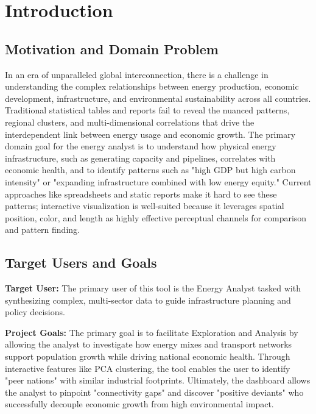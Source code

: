 \documentclass[conference]{IEEEtran}
\begin{document}
\section{Introduction}
\subsection{Motivation and Domain Problem}
In an era of unparalleled global interconnection, there is a challenge in understanding the complex relationships between energy production, economic development, infrastructure, and environmental sustainability across all countries. Traditional statistical tables and reports fail to reveal the nuanced patterns, regional clusters, and multi-dimensional correlations that drive the interdependent link between energy usage and economic growth. The primary domain goal for the energy analyst is to understand how physical energy infrastructure, such as generating capacity and pipelines, correlates with economic health, and to identify patterns such as "high GDP but high carbon intensity" or "expanding infrastructure combined with low energy equity." Current approaches like spreadsheets and static reports make it hard to see these patterns; interactive visualization is well-suited because it leverages spatial position, color, and length as highly effective perceptual channels for comparison and pattern finding.

\subsection{Target Users and Goals}
\textbf{Target User:} The primary user of this tool is the Energy Analyst tasked with synthesizing complex, multi-sector data to guide infrastructure planning and policy decisions.

\textbf{Project Goals:} The primary goal is to facilitate Exploration and Analysis by allowing the analyst to investigate how energy mixes and transport networks support population growth while driving national economic health. Through interactive features like PCA clustering, the tool enables the user to identify "peer nations" with similar industrial footprints. Ultimately, the dashboard allows the analyst to pinpoint "connectivity gaps" and discover "positive deviants" who successfully decouple economic growth from high environmental impact.
\end{document}
